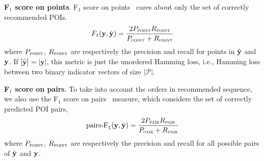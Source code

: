 \textbf{F$_1$ score on points}.
F$_1$ score on points~\cite{ijcai15} cares about only the set of correctly recommended POIs.
\begin{equation*}
F_1(\mathbf{y}, \hat{\mathbf{y}}) = \frac{2  P_{\textsc{point}}  R_{\textsc{point}}}{P_{\textsc{point}} + R_{\textsc{point}}}
\end{equation*}
where $P_\textsc{point}$, $R_\textsc{point}$ are respectively the precision and recall for points in $\hat{\mathbf{y}}$ and $\mathbf{y}$.
If $| \hat{\mathbf{y}} | = | \mathbf{y} |$, this metric is just the unordered Hamming loss,
i.e., Hamming loss between two binary indicator vectors of size $| \mathcal{P} |$.

\textbf{F$_1$ score on pairs}.
To take into account the orders in recommended sequence, 
we also use the F$_1$ score on pairs~\cite{cikm16paper} measure, which considers the set of correctly predicted POI pairs,
\begin{equation*}
\text{pairs-F}_1(\mathbf{y}, \hat{\mathbf{y}}) = \frac{2 P_{\textsc{pair}} R_{\textsc{pair}}}{P_{\textsc{pair}} + R_{\textsc{pair}}}
\end{equation*}
where $P_\textsc{point}$, $R_\textsc{point}$ are respectively the precision and recall for all possible pairs of $\hat{\mathbf{y}}$ and $\mathbf{y}$.


